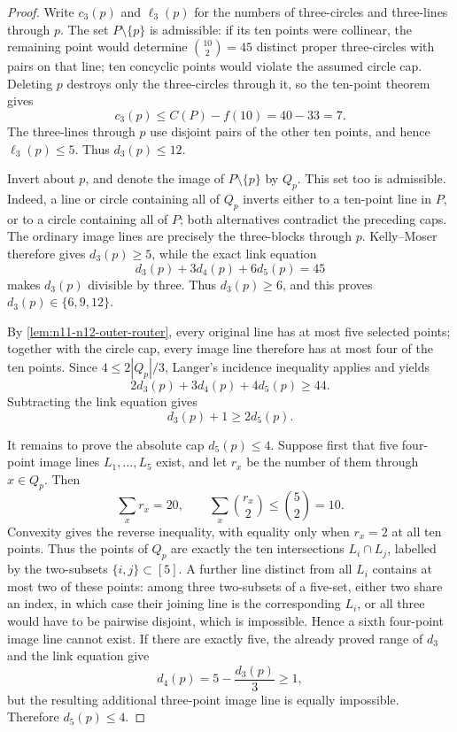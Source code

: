 \begin{proof}
Write \(c_3(p)\) and \(\ell_3(p)\) for the numbers of three-circles and
three-lines through \(p\).  The set \(P\setminus\{p\}\) is admissible:
if its ten points were collinear, the remaining point would determine
\(\binom{10}{2}=45\) distinct proper three-circles with pairs on that line;
ten concyclic points would violate the assumed circle cap.  Deleting \(p\)
destroys only the three-circles through it, so the ten-point theorem gives
\[
 c_3(p)\le C(P)-f(10)=40-33=7.
\]
The three-lines through \(p\) use disjoint pairs of the other ten points,
and hence \(\ell_3(p)\le5\).  Thus \(d_3(p)\le12\).

Invert about \(p\), and denote the image of \(P\setminus\{p\}\) by \(Q_p\).
This set too is admissible.  Indeed, a line or circle containing all of
\(Q_p\) inverts either to a ten-point line in \(P\), or to a circle
containing all of \(P\); both alternatives contradict the preceding caps.
The ordinary image lines are precisely the three-blocks through \(p\).
Kelly--Moser therefore gives \(d_3(p)\ge5\), while the exact link equation
\[
 d_3(p)+3d_4(p)+6d_5(p)=45
\]
makes \(d_3(p)\) divisible by three.  Thus \(d_3(p)\ge6\), and this proves
\(d_3(p)\in\{6,9,12\}\).

By \cref{lem:n11-n12-outer-router}, every original line has at most five
selected points; together with the circle cap, every image line therefore
has at most four of the ten points.  Since
\(4\le2|Q_p|/3\), Langer's incidence inequality applies and yields
\[
 2d_3(p)+3d_4(p)+4d_5(p)\ge44.
\]
Subtracting the link equation gives
\begin{equation}\label{eq:C40-pivot-langer}
 d_3(p)+1\ge2d_5(p).
\end{equation}

It remains to prove the absolute cap \(d_5(p)\le4\).  Suppose first that
five four-point image lines \(L_1,\ldots,L_5\) exist, and let \(r_x\) be
the number of them through \(x\in Q_p\).  Then
\[
 \sum_x r_x=20,\qquad
 \sum_x\binom{r_x}{2}\le\binom52=10.
\]
Convexity gives the reverse inequality, with equality only when
\(r_x=2\) at all ten points.  Thus the points of \(Q_p\) are exactly the
ten intersections \(L_i\cap L_j\), labelled by the two-subsets
\(\{i,j\}\subset[5]\).  A further line distinct from all \(L_i\) contains
at most two of these points: among three two-subsets of a five-set, either
two share an index, in which case their joining line is the corresponding
\(L_i\), or all three would have to be pairwise disjoint, which is
impossible.  Hence a sixth four-point image line cannot exist.  If there
are exactly five, the already proved range of \(d_3\) and the link equation
give
\[
 d_4(p)=5-\frac{d_3(p)}3\ge1,
\]
but the resulting additional three-point image line is equally impossible.
Therefore \(d_5(p)\le4\).


\end{proof}
